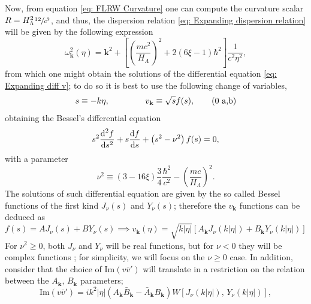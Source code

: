 Now, from equation \ref{eq: FLRW Curvature} one can compute the curvature scalar $R=H_\Lambda^2\sfrac{12}{c^2}$, and thus, the dispersion relation \ref{eq: Expanding dispersion relation} will be given by the following expression
\begin{equation}\label{eq: de Sitter dispersion relation}
	\omega^2_\mathbf{k}(\eta)=\mathbf{k}^2+\left[\left(\frac{mc^2}{H_\Lambda}\right)^2+2\left(6\xi-1\right)\hbar^2\right]\frac{1}{c^2\eta^2},
\end{equation}
from which one might obtain the solutions of the differential equation \ref{eq: Expanding diff v}; to do so it is best to use the following change of variables,
\begin{subequations}
	\begin{gather}
		s\equiv -k\eta,\hspace{1.5cm}v_\mathbf{k}\equiv \sqrt{s}f(s),\tag{\theequation \,\,a,b}
	\end{gather}
\end{subequations}
obtaining the Bessel's differential equation
\begin{equation}
	s^2\frac{\text{d}^2f}{\text{d} s^2}+s\frac{\text{d} f}{\text{d} s}+\left(s^2-\nu^2\right)f(s)=0,
\end{equation}
with a parameter
\begin{equation}
	\nu^2\equiv \left(3-16\xi\right)\frac{3}{4}\frac{\hbar^2}{c^2}-\left(\frac{mc}{H_\Lambda}\right)^2.
\end{equation}
The solutions of such differential equation are given by the so called Bessel functions of the first kind $J_\nu(s)$ and $Y_\nu(s)$; therefore the $v_\mathbf{k}$ functions can be deduced as
\begin{equation}\label{eq: de Sitter general v}
	f(s)=AJ_\nu(s)+BY_\nu(s)\implies v_\mathbf{k}(\eta)=\sqrt{k|\eta|}\left[A_\mathbf{k}J_\nu(k|\eta|)+B_\mathbf{k}Y_\nu(k|\eta|)\right]
\end{equation}
For $\nu^2\geq 0$, both $J_\nu$ and $Y_\nu$ will be real functions, but for $\nu<0$ they will be complex functions \cite{BesselComplex}; for simplicity, we will focus on the $\nu\geq 0$ case. In addition, consider that the choice of $\text{Im}(v\bar v')$ will translate in a restriction on the relation between the  $A_\mathbf{k},\,B_\mathbf{k}$ parameters;
\begin{equation}
	\text{Im}\left(v\bar{v}'\right)=ik^2|\eta|\left(A_\mathbf{k}\bar{B}_\mathbf{k}-\bar{A}_\mathbf{k}B_\mathbf{k}\right)W\left[J_\nu\left(k|\eta|\right),\,Y_\nu\left(k|\eta|\right)\right],
\end{equation}
